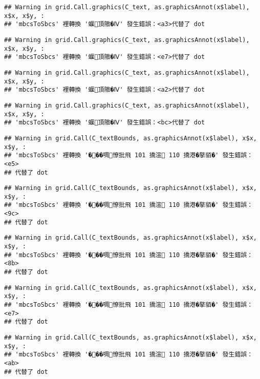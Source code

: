 \documentclass[
]{article}
\begin{document}
\begin{verbatim}
## Warning in grid.Call.graphics(C_text, as.graphicsAnnot(x$label), x$x, x$y, :
## 'mbcsToSbcs' 裡轉換 '蝘頂隞�Ⅳ' 發生錯誤：<a3>代替了 dot
\end{verbatim}

\begin{verbatim}
## Warning in grid.Call.graphics(C_text, as.graphicsAnnot(x$label), x$x, x$y, :
## 'mbcsToSbcs' 裡轉換 '蝘頂隞�Ⅳ' 發生錯誤：<e7>代替了 dot
\end{verbatim}

\begin{verbatim}
## Warning in grid.Call.graphics(C_text, as.graphicsAnnot(x$label), x$x, x$y, :
## 'mbcsToSbcs' 裡轉換 '蝘頂隞�Ⅳ' 發生錯誤：<a2>代替了 dot
\end{verbatim}

\begin{verbatim}
## Warning in grid.Call.graphics(C_text, as.graphicsAnnot(x$label), x$x, x$y, :
## 'mbcsToSbcs' 裡轉換 '蝘頂隞�Ⅳ' 發生錯誤：<bc>代替了 dot
\end{verbatim}

\begin{verbatim}
## Warning in grid.Call(C_textBounds, as.graphicsAnnot(x$label), x$x, x$y, :
## 'mbcsToSbcs' 裡轉換 '���啁憭批飛 101 撟渲 110 撟港�摮貊�' 發生錯誤：<e5>
## 代替了 dot
\end{verbatim}

\begin{verbatim}
## Warning in grid.Call(C_textBounds, as.graphicsAnnot(x$label), x$x, x$y, :
## 'mbcsToSbcs' 裡轉換 '���啁憭批飛 101 撟渲 110 撟港�摮貊�' 發生錯誤：<9c>
## 代替了 dot
\end{verbatim}

\begin{verbatim}
## Warning in grid.Call(C_textBounds, as.graphicsAnnot(x$label), x$x, x$y, :
## 'mbcsToSbcs' 裡轉換 '���啁憭批飛 101 撟渲 110 撟港�摮貊�' 發生錯誤：<8b>
## 代替了 dot
\end{verbatim}

\begin{verbatim}
## Warning in grid.Call(C_textBounds, as.graphicsAnnot(x$label), x$x, x$y, :
## 'mbcsToSbcs' 裡轉換 '���啁憭批飛 101 撟渲 110 撟港�摮貊�' 發生錯誤：<e7>
## 代替了 dot
\end{verbatim}

\begin{verbatim}
## Warning in grid.Call(C_textBounds, as.graphicsAnnot(x$label), x$x, x$y, :
## 'mbcsToSbcs' 裡轉換 '���啁憭批飛 101 撟渲 110 撟港�摮貊�' 發生錯誤：<ab>
## 代替了 dot
\end{verbatim}
\end{document}
